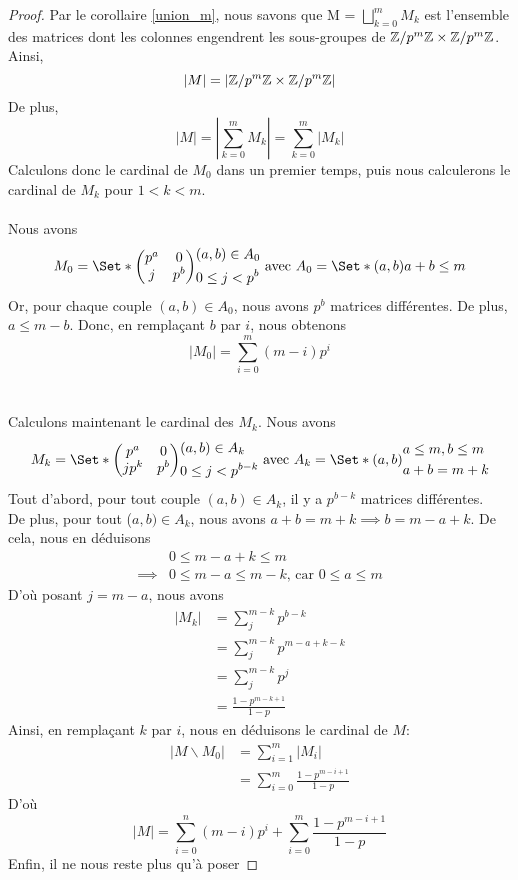 \documentclass[12pt]{article}
\newcommand{\ZpmZ}{\Z/p^m\Z}
\newcommand{\ZZpm}{\ZpmZ \x \ZpmZ}
\newcommand{\Mz}{\Set*{
	\begin{pmatrix}
		p^a  & 0   \\
		j & p^b
	\end{pmatrix}
}{
	\begin{aligned}
		 & (a, b) \in A_0      \\
		 & 0 \le j < p^{b}
	\end{aligned}
}}
\newcommand{\Mk}{\Set*{
	\begin{pmatrix}
		p^a  & 0   \\
		jp^k & p^b
	\end{pmatrix}
}{
	\begin{aligned}
		 & (a, b) \in A_k      \\
		 & 0 \le j < p^{b - k}
	\end{aligned}
}}
\newcommand{\Az}{\Set*{(a,b)}{ a + b \le m}}
\newcommand{\Ak}{\Set*{
	(a,b)}{
	\begin{aligned}
		 & a \le m, b \le m \\
		 & a + b = m + k
	\end{aligned}
}}
\begin{document}
\begin{proof}
	Par le corollaire \ref{union_m}, nous savons que M = $\bigsqcup\limits_{k = 0}^{m} M_k$
	est l'ensemble des matrices dont les colonnes engendrent les sous-groupes de $\ZZpm$.
	Ainsi,
	$$| M | = |\ZZpm|$$
	De plus,
	$$|M| = |\sum_{k=0}^{m} M_k| = \sum_{k=0}^{m}|M_k|$$
	\noindent
	Calculons donc le cardinal de $M_0$ dans un premier temps, puis nous calculerons
	le cardinal de $M_k$ pour $1 < k < m$.\\\vspace*{1cm}\\
	Nous avons $$M_0 =\Mz \text{ avec } A_0 = \Az$$
	Or, pour chaque couple $(a,b) \in A_0$, nous avons $p^b$ matrices différentes.
	De plus, $a \le m - b$. Donc, en remplaçant $b$ par $i$, nous obtenons
	$$ |M_0| = \sum_{i=0}^{m}(m-i)p^i$$
	\\\vspace*{1cm}\\
	Calculons maintenant le cardinal des $M_k$. Nous avons
	$$M_k = \Mk \text{ avec } A_k = \Ak$$
	Tout d'abord, pour tout couple $(a,b) \in A_k$, il y a $p^{ b-k}$ matrices différentes.\\
	De plus, pour tout ($a,b) \in A_k$, nous avons
	$a + b = m + k \implies b = m - a +k$. De cela, nous en déduisons
	\begin{equation*}
		\begin{aligned}
			         & 0 \le m - a + k \le m                             \\
			\implies & 0\le m - a \le m - k \text{, car  } 0 \le a \le m
		\end{aligned}
	\end{equation*}
	D'où posant $j = m - a$, nous avons
	\begin{equation*}
		\begin{split}
			|M_k| &= \sum_{j}^{m - k}p^{b-k}\\
			&= \sum_{j}^{m - k}p^{m - a + k - k}\\
			&= \sum_{j}^{m - k}p^{j}\\
			&= \frac{1 - p^{m-k+1}}{1-p}
		\end{split}
	\end{equation*}
	Ainsi, en remplaçant $k$ par $i$, nous en déduisons le cardinal de $M$:
	\begin{equation*}
		\begin{split}
			|M \backslash M_0| &= \sum_{i=1}^{m}|M_i|\\
			&= \sum_{i=0}^{m}\frac{1 - p^{m-i+1}}{1-p}
		\end{split}
	\end{equation*}
	D'où
	$$|M| = \sum_{i=0}^{n}(m-i)p^i + \sum_{i = 0}^{m}\frac{1- p^{m-i+1}}{1 - p}$$
	Enfin, il ne nous reste plus qu'à poser
\end{proof}
\end{document}
